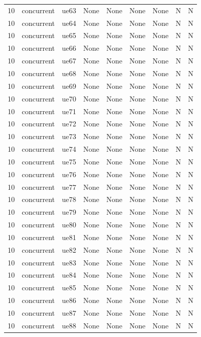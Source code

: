 \begin{table}[ht]
\begin{tabular}{|c|c|c|c|c|c|c|c|c|}
10 & concurrent & ue63 & None & None & None & None & N & N \\
10 & concurrent & ue64 & None & None & None & None & N & N \\
10 & concurrent & ue65 & None & None & None & None & N & N \\
10 & concurrent & ue66 & None & None & None & None & N & N \\
10 & concurrent & ue67 & None & None & None & None & N & N \\
10 & concurrent & ue68 & None & None & None & None & N & N \\
10 & concurrent & ue69 & None & None & None & None & N & N \\
10 & concurrent & ue70 & None & None & None & None & N & N \\
10 & concurrent & ue71 & None & None & None & None & N & N \\
10 & concurrent & ue72 & None & None & None & None & N & N \\
10 & concurrent & ue73 & None & None & None & None & N & N \\
10 & concurrent & ue74 & None & None & None & None & N & N \\
10 & concurrent & ue75 & None & None & None & None & N & N \\
10 & concurrent & ue76 & None & None & None & None & N & N \\
10 & concurrent & ue77 & None & None & None & None & N & N \\
10 & concurrent & ue78 & None & None & None & None & N & N \\
10 & concurrent & ue79 & None & None & None & None & N & N \\
10 & concurrent & ue80 & None & None & None & None & N & N \\
10 & concurrent & ue81 & None & None & None & None & N & N \\
10 & concurrent & ue82 & None & None & None & None & N & N \\
10 & concurrent & ue83 & None & None & None & None & N & N \\
10 & concurrent & ue84 & None & None & None & None & N & N \\
10 & concurrent & ue85 & None & None & None & None & N & N \\
10 & concurrent & ue86 & None & None & None & None & N & N \\
10 & concurrent & ue87 & None & None & None & None & N & N \\
10 & concurrent & ue88 & None & None & None & None & N & N \\

\end{tabular}
\end{table}
